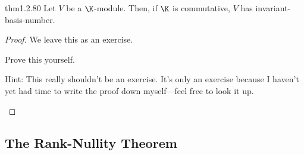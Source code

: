 \begin{thm}{}{thm1.2.80}
	Let $V$ be a $\K$-module.  Then, if $\K$ is commutative, $V$ has invariant-basis-number.
	\begin{proof}
		We leave this as an exercise.
		\begin{exr}[breakable=false]{}{}
			Prove this yourself.
			\begin{rmk}
				Hint:  This really shouldn't be an exercise.  It's only an exercise because I haven't yet had time to write the proof down myself---feel free to look it up.
			\end{rmk}
		\end{exr}
	\end{proof}
\end{thm}

\subsection{The Rank-Nullity Theorem}

